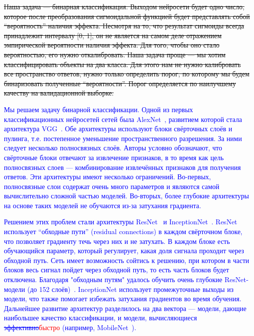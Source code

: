 \documentclass[
aps,%
12pt,%
final,%
notitlepage,%
oneside,%
onecolumn,%
nobibnotes,%
nofootinbib,%
superscriptaddress,%
noshowpacs,%
centertags]%
{revtex4}
\begin{document}
\sout{Наша задача --- бинарная классификация. Выходом нейросети будет одно число, которое после преобразования  сигмоидальной функцией будет представлять собой ``вероятность'' наличия эффекта. Несмотря на то, что результат сигмоиды всегда принадлежит интервалу [0, 1], он не является на самом деле  отражением эмпирической вероятности наличия эффекта. Для того, чтобы  оно стало вероятностью, его нужно откалибровать. Наша задача проще ---  мы хотим классифицировать объекты на два класса. Для этого нам не нужно  калибровать все пространство ответов, нужно только определить порог, по  которому мы будем бинаризовать полученные ``вероятности''. Порог определяется по наилучшему качеству на валидационной выборке.}

\textcolor{blue}{Мы решаем задачу бинарной классификации. Одной из первых классификационных нейросетей сетей была AlexNet~\cite{AlexNET1}, развитием которой  стала архитектура VGG~\cite{VGG1}. Обе архитектуры используют блоки свёрточных слоёв и пулинга, т.е. постепенное уменьшение пространственного разрешения. За ними следует несколько полносвязных слоёв. Авторы условно обозначают, что свёрточные блоки отвечают за извлечение признаков, в то время как цель полносвязных слоев --- комбинирование извлечённых признаков для получения ответов. Эти архитектуры имеют несколько ограничений. Во-первых, полносвязные слои содержат очень много параметров и являются самой вычислительно сложной частью моделей. Во-вторых, более глубокие архитектуры на основе таких моделей не обучаются из-за затухания градиента.}

\textcolor{blue}{Решением этих проблем стали архитектуры ResNet~\cite{resNET1} и InceptionNet~\cite{InceptionNet1}. ResNet использует ``обходные пути'' (residual connections) в каждом свёрточном блоке, что позволяет градиенту течь через них и не затухать. В каждом блоке есть обучающийся параметр, который регулирует, какая доля сигнала проходит через обходной путь. Сеть имеет возможность сойтись к решению, при котором в части блоков весь сигнал пойдет через обходной путь, то есть часть блоков будет отключена. Благодаря "обходным путям" удалось обучить очень глубокие ResNet-модели (до 152 слоёв)~\cite{resNET1}. InceptionNet использует промежуточные выходы из модели, что также помогает избежать затухания градиентов во время обучения. Дальнейшее развитие архитектур разделилось на два вектора --- модели, дающие наибольшее качество классификации, и модели, вычисляющиеся \sout{эффективно}\textcolor{red}{быстро} (например, MobileNet~\cite{MobileNet}).}
\end{document}
